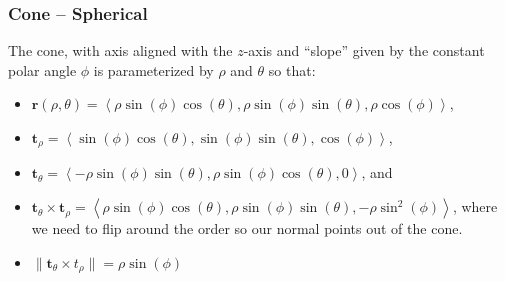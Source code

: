 \documentclass[10pt]{article}
\newcommand{\mb}[1]{\mathbf{#1}}
\newcommand{\brackett}[1]{\left\langle #1 \right\rangle}
\newcommand{\vecfuc}[2]{\mb{#1}(#2)}
\newcommand{\mbi}{\mb{i}}
\newcommand{\mbj}{\mb{j}}
\newcommand{\mbk}{\mb{k}}
\begin{document}
\subsubsection*{Cone -- Spherical}

The cone, with axis aligned with the \(z\)-axis and ``slope'' given by the constant polar angle \(\phi\) is parameterized by \(\rho\) and \(\theta\) so that:
\begin{itemize}
    \item \(\vecfuc{r}{\rho,\theta} = \brackett{\rho \sin(\phi) \cos(\theta), \rho \sin(\phi) \sin(\theta), \rho \cos(\phi)}\),
    \item \(\mb{t}_{\rho} = \brackett{\sin(\phi) \cos(\theta), \sin(\phi) \sin(\theta), \cos(\phi)}\),
    \item \(\mb{t}_{\theta} = \brackett{-\rho \sin(\phi) \sin(\theta), \rho \sin(\phi) \cos(\theta), 0}\), and
    \item \(\mb{t}_{\theta} \times \mb{t}_{\rho} = \brackett{\rho \sin(\phi) \cos(\theta), \rho \sin(\phi) \sin(\theta), -\rho \sin^{2}(\phi)}\), where we need to flip around the order so our normal points out of the cone.

    \item \(\| \mb{t}_{\theta} \times t_{\rho} \| = \rho \sin(\phi)\)
\end{itemize}
\end{document}
